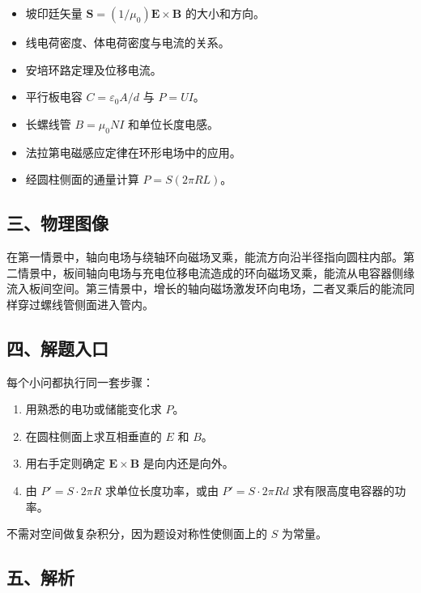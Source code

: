 \documentclass[12pt,a4paper,UTF8]{ctexart}
\newcommand{\tightlist}{\setlength{\itemsep}{0pt}\setlength{\parskip}{0pt}}
\begin{document}
\begin{itemize}
\tightlist
\item
  坡印廷矢量 \(\bm S=(1/\mu_0)\bm E\times\bm B\) 的大小和方向。
\item
  线电荷密度、体电荷密度与电流的关系。
\item
  安培环路定理及位移电流。
\item
  平行板电容 \(C=\varepsilon_0A/d\) 与 \(P=UI\)。
\item
  长螺线管 \(B=\mu_0NI\) 和单位长度电感。
\item
  法拉第电磁感应定律在环形电场中的应用。
\item
  经圆柱侧面的通量计算 \(P=S(2\pi RL)\)。
\end{itemize}

\subsection{三、物理图像}\label{ux4e09ux7269ux7406ux56feux50cf-4}

在第一情景中，轴向电场与绕轴环向磁场叉乘，能流方向沿半径指向圆柱内部。第二情景中，板间轴向电场与充电位移电流造成的环向磁场叉乘，能流从电容器侧缘流入板间空间。第三情景中，增长的轴向磁场激发环向电场，二者叉乘后的能流同样穿过螺线管侧面进入管内。

\subsection{四、解题入口}\label{ux56dbux89e3ux9898ux5165ux53e3-4}

每个小问都执行同一套步骤：

\begin{enumerate}
\def\labelenumi{\arabic{enumi}.}
\tightlist
\item
  用熟悉的电功或储能变化求 \(P\)。
\item
  在圆柱侧面上求互相垂直的 \(E\) 和 \(B\)。
\item
  用右手定则确定 \(\bm E\times\bm B\) 是向内还是向外。
\item
  由 \(P'=S\cdot2\pi R\) 求单位长度功率，或由 \(P'=S\cdot2\pi Rd\)
  求有限高度电容器的功率。
\end{enumerate}

不需对空间做复杂积分，因为题设对称性使侧面上的 \(S\) 为常量。

\subsection{五、解析}\label{ux4e94ux89e3ux6790-4}
\end{document}
